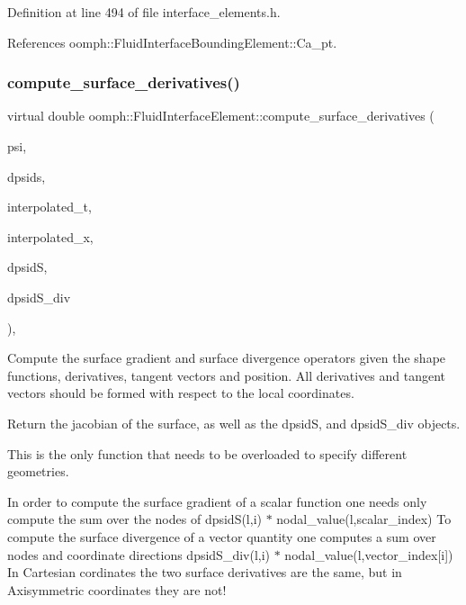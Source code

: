 Definition at line 494 of file interface\+\_\+elements.\+h.



References oomph\+::\+Fluid\+Interface\+Bounding\+Element\+::\+Ca\+\_\+pt.

\mbox{\label{classoomph_1_1FluidInterfaceElement_a0180a8e36fadbbe6984f9b3c5edffc81}} 
\subsubsection{\texorpdfstring{compute\+\_\+surface\+\_\+derivatives()}{compute\_surface\_derivatives()}}
{\footnotesize\ttfamily virtual double oomph\+::\+Fluid\+Interface\+Element\+::compute\+\_\+surface\+\_\+derivatives (\begin{DoxyParamCaption}\item[{const Shape \&}]{psi,  }\item[{const D\+Shape \&}]{dpsids,  }\item[{const Dense\+Matrix$<$ double $>$ \&}]{interpolated\+\_\+t,  }\item[{const Vector$<$ double $>$ \&}]{interpolated\+\_\+x,  }\item[{D\+Shape \&}]{dpsidS,  }\item[{D\+Shape \&}]{dpsid\+S\+\_\+div }\end{DoxyParamCaption})\hspace{0.3cm}{\ttfamily [protected]}, {}}



Compute the surface gradient and surface divergence operators given the shape functions, derivatives, tangent vectors and position. All derivatives and tangent vectors should be formed with respect to the local coordinates. 

Return the jacobian of the surface, as well as the dpsidS, and dpsid\+S\+\_\+div objects.

This is the only function that needs to be overloaded to specify different geometries.

In order to compute the surface gradient of a scalar function one needs only compute the sum over the nodes of dpsid\+S(l,i) $\ast$ nodal\+\_\+value(l,scalar\+\_\+index) To compute the surface divergence of a vector quantity one computes a sum over nodes and coordinate directions dpsid\+S\+\_\+div(l,i) $\ast$ nodal\+\_\+value(l,vector\+\_\+index\mbox{[}i\mbox{]}) In Cartesian cordinates the two surface derivatives are the same, but in Axisymmetric coordinates they are not! 

